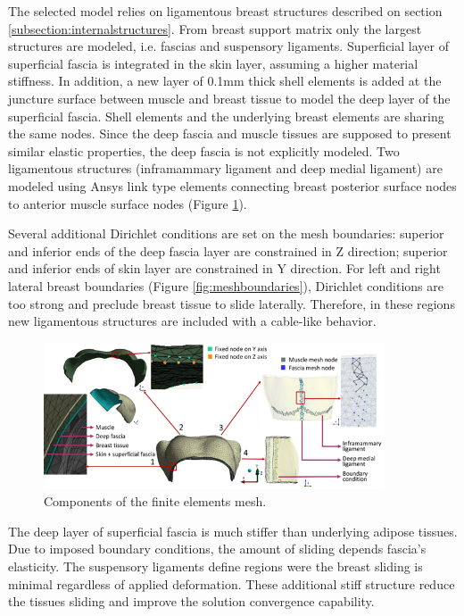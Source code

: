 The selected  model relies on ligamentous breast structures described on section \ref{subsection:internalstructures}. From breast support matrix only the largest structures are modeled, i.e. fascias and suspensory ligaments.  Superficial layer of superficial fascia is integrated in the skin layer, assuming a higher material stiffness. In addition, a new layer of 0.1mm thick shell elements is added at the juncture surface between muscle and breast tissue to model the deep layer of the superficial fascia. Shell elements and the underlying breast elements are sharing the same nodes. Since the deep fascia and muscle tissues are supposed to present similar elastic properties, the deep fascia is not explicitly modeled. Two ligamentous structures (inframammary ligament and deep medial ligament) are modeled using Ansys link type elements connecting breast posterior surface nodes to anterior muscle surface nodes (Figure \ref{fig:mesh_components_BC}).  


Several additional Dirichlet conditions are set on the mesh boundaries: superior and inferior ends of the deep fascia layer are constrained in Z direction; superior and inferior ends of skin layer are constrained in Y direction. For left and right lateral breast boundaries (Figure \ref{fig:meshboundaries}), Dirichlet conditions are too strong and preclude breast tissue to slide laterally. Therefore, in these regions new ligamentous structures are included with a cable-like behavior.



\begin{figure}[!h]
\centering
\includegraphics[width=0.9\textwidth,keepaspectratio]{figures/mesh_components.png} 
\caption{Components of the finite elements mesh.}\label{fig:mesh_components_BC}
\end{figure}

 The deep layer of superficial fascia is much stiffer than underlying adipose tissues. Due to imposed boundary conditions, the amount of sliding depends fascia's elasticity. The suspensory ligaments define regions were the breast sliding is minimal regardless of applied deformation. These additional stiff structure reduce the tissues sliding and improve the solution convergence capability. 

